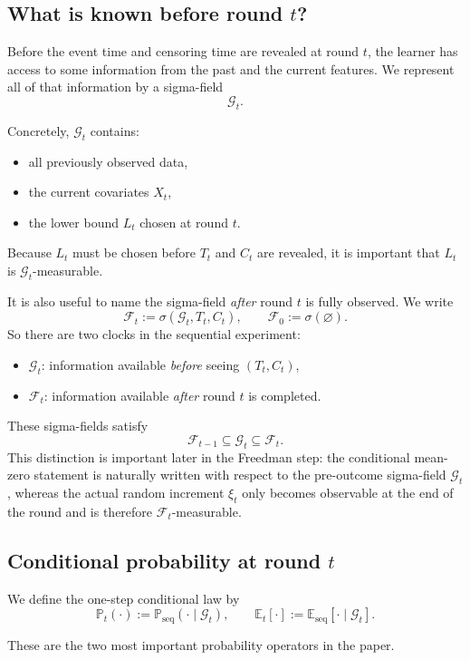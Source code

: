 \documentclass[11pt]{article}
\newcommand{\E}{\mathbb{E}}
\newcommand{\Prob}{\mathbb{P}}
\newcommand{\1}{\mathbf{1}}
\newcommand{\seq}{\mathrm{seq}}
\newcommand{\cG}{\mathcal{G}}
\newcommand{\cF}{\mathcal{F}}
\begin{document}
\subsection{What is known before round $t$?}

Before the event time and censoring time are revealed at round $t$, the learner has access to some information from the past and the current features. We represent all of that information by a sigma-field
\[
\cG_t.
\]

Concretely, $\cG_t$ contains:
\begin{itemize}[leftmargin=*,itemsep=2pt]
  \item all previously observed data,
  \item the current covariates $X_t$,
  \item the lower bound $L_t$ chosen at round $t$.
\end{itemize}

Because $L_t$ must be chosen before $T_t$ and $C_t$ are revealed, it is important that $L_t$ is $\cG_t$-measurable.

It is also useful to name the sigma-field \emph{after} round $t$ is fully observed. We write
\[
\cF_t:=\sigma(\cG_t,T_t,C_t),
\qquad \cF_0:=\sigma(\varnothing).
\]
So there are two clocks in the sequential experiment:
\begin{itemize}[leftmargin=*,itemsep=2pt]
  \item $\cG_t$: information available \emph{before} seeing $(T_t,C_t)$,
  \item $\cF_t$: information available \emph{after} round $t$ is completed.
\end{itemize}
These sigma-fields satisfy
\[
\cF_{t-1}\subseteq \cG_t \subseteq \cF_t.
\]
This distinction is important later in the Freedman step: the conditional mean-zero statement is naturally written with respect to the pre-outcome sigma-field $\cG_t$, whereas the actual random increment $\xi_t$ only becomes observable at the end of the round and is therefore $\cF_t$-measurable.

\subsection{Conditional probability at round $t$}

We define the one-step conditional law by
\[
\Prob_t(\cdot):=\Prob_{\seq}(\cdot\mid \cG_t),
\qquad
\E_t[\cdot]:=\E_{\seq}[\cdot\mid \cG_t].
\]

These are the two most important probability operators in the paper.
\end{document}
